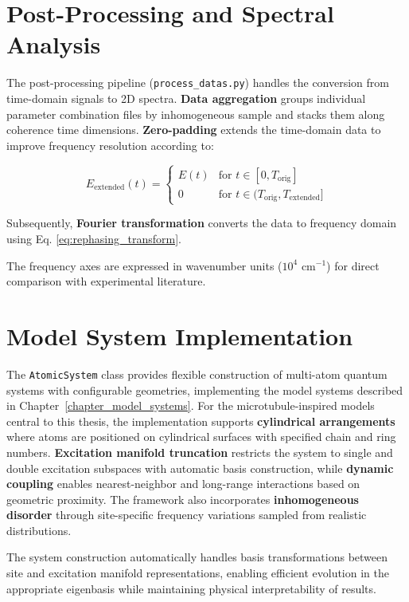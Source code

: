 \section{Post-Processing and Spectral Analysis}
\label{sec:post_processing}

\noindent
The post-processing pipeline (\texttt{process\_datas.py}) handles the conversion from time-domain signals to 2D spectra. \textbf{Data aggregation} groups individual parameter combination files by inhomogeneous sample and stacks them along coherence time dimensions. \textbf{Zero-padding} extends the time-domain data to improve frequency resolution according to:

\begin{equation}
	\label{eq:zero_padding}
	E_{\text{extended}}(t) = \begin{cases}
		E(t) & \text{for } t \in [0, T_{\text{orig}}] \\
		0 & \text{for } t \in (T_{\text{orig}}, T_{\text{extended}}]
	\end{cases}
\end{equation}

\noindent
Subsequently, \textbf{Fourier transformation} converts the data to frequency domain using Eq. \eqref{eq:rephasing_transform}.

\noindent
The frequency axes are expressed in wavenumber units ($10^4$ cm$^{-1}$) for direct comparison with experimental literature.

\section{Model System Implementation}
\label{sec:model_systems}

\noindent
The \texttt{AtomicSystem} class provides flexible construction of multi-atom quantum systems with configurable geometries, implementing the model systems described in Chapter~\ref{chapter_model_systems}. For the microtubule-inspired models central to this thesis, the implementation supports \textbf{cylindrical arrangements} where atoms are positioned on cylindrical surfaces with specified chain and ring numbers. \textbf{Excitation manifold truncation} restricts the system to single and double excitation subspaces with automatic basis construction, while \textbf{dynamic coupling} enables nearest-neighbor and long-range interactions based on geometric proximity. The framework also incorporates \textbf{inhomogeneous disorder} through site-specific frequency variations sampled from realistic distributions.

\noindent
The system construction automatically handles basis transformations between site and excitation manifold representations, enabling efficient evolution in the appropriate eigenbasis while maintaining physical interpretability of results.